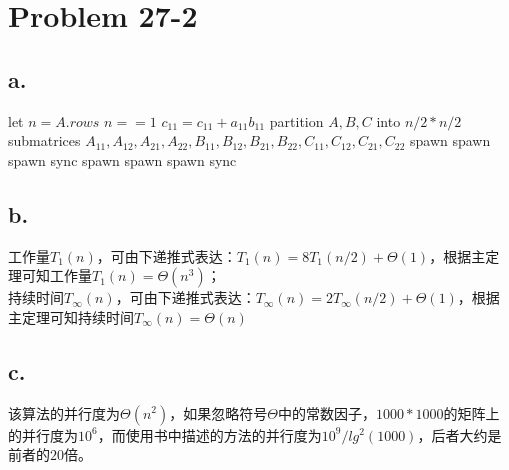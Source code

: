 \documentclass{article}
\begin{document}
  \section*{Problem 27-2}
  	\subsection*{a.}
  	  \begin{codebox}
  	  	\li let $n=A.rows$
  	  	\li \If $n==1$
  	  	\li \Do $c_{11}=c_{11}+a_{11}b_{11}$
  	  	\li \Else partition $A,B,C$ into $n/2 * n/2$ submatrices $A_{11},A_{12},A_{21},A_{22},B_{11},B_{12},B_{21},B_{22},C_{11},C_{12},C_{21},C_{22}$
  	  	\li spawn 
  	  	\li spawn 
  	  	\li spawn 
  	  	\li {}
  	  	\li sync
  	  	\li spawn 
  	  	\li spawn 
  	  	\li spawn 
  	  	\li {}
  	  	\li sync
  	  	\End
  	  \end{codebox}
  	\subsection*{b.}
  	  \noindent 工作量$T_1(n)$，可由下递推式表达：$T_1(n)=8T_1(n/2)+\Theta(1)$，根据主定理可知工作量$T_1(n)=\Theta(n^3)$；\\
  	  持续时间$T_{\infty}(n)$，可由下递推式表达：$T_{\infty}(n)=2T_{\infty}(n/2)+\Theta(1)$，根据主定理可知持续时间$T_{\infty}(n)=\Theta(n)$
  	\subsection*{c.}
  	  \indent 该算法的并行度为$\Theta(n^2)$，如果忽略符号$\Theta$中的常数因子，$1000*1000$的矩阵上的并行度为$10^6$，而使用书中描述的方法的并行度为$10^9/lg^2(1000)$，后者大约是前者的$20$倍。
\end{document}
